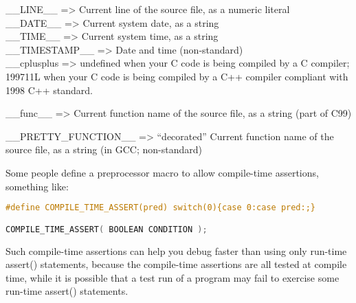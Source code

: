 \_\_LINE\_\_ =\textgreater{} Current line of the source file, as a numeric literal\\

\_\_DATE\_\_ =\textgreater{} Current system date, as a string\\

\_\_TIME\_\_ =\textgreater{} Current system time, as a string\\

\_\_TIMESTAMP\_\_ =\textgreater{} Date and time (non-standard)\\

\_\_cplusplus =\textgreater{} undefined when your C code is being compiled by a C compiler; 199711L when your C code is being compiled by a C++ compiler compliant with 1998 C++ standard.

\_\_func\_\_ =\textgreater{} Current function name of the source file, as a string (part of C99)

\_\_PRETTY\_FUNCTION\_\_ =\textgreater{} ``decorated'' Current function name of the source file, as a string (in GCC; non-standard)


Some people define a preprocessor macro to allow compile-time assertions,
something like:
\lstset{basicstyle=\scriptsize, numbers=left, captionpos=b, tabsize=4}
\begin{lstlisting}[caption=Section \thesection listing \arabic{preprocnt},language={C},
breaklines=true,xleftmargin=15pt, label=lst:section\thesection listing\arabic{preprocnt}]
#define COMPILE_TIME_ASSERT(pred) switch(0){case 0:case pred:;}

COMPILE_TIME_ASSERT( BOOLEAN CONDITION );
\end{lstlisting}

Such compile-time assertions can help you debug faster than using only run-time
assert() statements, because the compile-time assertions are all tested at
compile time, while it is possible that a test run of a program may fail to
exercise some run-time assert() statements.
